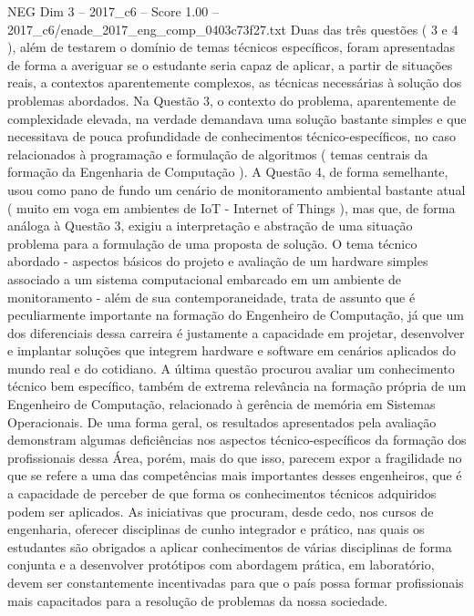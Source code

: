\begin{textsample}{NEG Dim 3 – 2017\_c6 – Score 1.00 – 2017\_c6/enade\_2017\_eng\_comp\_0403c73f27.txt}
Duas das três questões ( 3 e 4 ), além de testarem o domínio de temas técnicos específicos, foram apresentadas de forma a averiguar se o estudante seria capaz de aplicar, a partir de situações reais, a contextos aparentemente complexos, as técnicas necessárias à solução dos problemas abordados.
Na Questão 3, o contexto do problema, aparentemente de complexidade elevada, na verdade demandava uma solução bastante simples e que necessitava de pouca profundidade de conhecimentos técnico-específicos, no caso relacionados à programação e formulação de algoritmos ( temas centrais da formação da Engenharia de Computação ).
A Questão 4, de forma semelhante, usou como pano de fundo um cenário de monitoramento ambiental bastante atual ( muito em voga em ambientes de IoT - Internet of Things ), mas que, de forma análoga à Questão 3, exigiu a interpretação e abstração de uma situação problema para a formulação de uma proposta de solução.
O tema técnico abordado - aspectos básicos do projeto e avaliação de um hardware simples associado a um sistema computacional embarcado em um ambiente de monitoramento - além de sua contemporaneidade, trata de assunto que é peculiarmente importante na formação do Engenheiro de Computação, já que um dos diferenciais dessa carreira é justamente a capacidade em projetar, desenvolver e implantar soluções que integrem hardware e software em cenários aplicados do mundo real e do cotidiano.
A última questão procurou avaliar um conhecimento técnico bem específico, também de extrema relevância na formação própria de um Engenheiro de Computação, relacionado à gerência de memória em Sistemas Operacionais.
De uma forma geral, os resultados apresentados pela avaliação demonstram algumas deficiências nos aspectos técnico-específicos da formação dos profissionais dessa Área, porém, mais do que isso, parecem expor a fragilidade no que se refere a uma das competências mais importantes desses engenheiros, que é a capacidade de perceber de que forma os conhecimentos técnicos adquiridos podem ser aplicados.
As iniciativas que procuram, desde cedo, nos cursos de engenharia, oferecer disciplinas de cunho integrador e prático, nas quais os estudantes são obrigados a aplicar conhecimentos de várias disciplinas de forma conjunta e a desenvolver protótipos com abordagem prática, em laboratório, devem ser constantemente incentivadas para que o país possa formar profissionais mais capacitados para a resolução de problemas da nossa sociedade.

\end{textsample}
